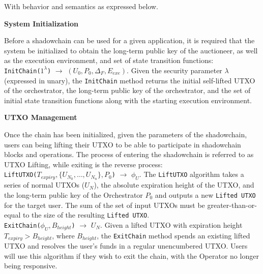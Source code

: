 \documentclass[10pt,a4paper]{article}
\theoremstyle{definition}
\begin{document}
With behavior and semantics as expressed below. \\

\begin{center}
    \textbf{System Initialization}
\end{center}

Before a shadowchain can be used for a given application, it is required that
the system be initialized to obtain the long-term public key of the auctioneer,
as well as the execution environment, and set of state transition functions: \\

\texttt{InitChain($1^{\lambda}$)} $\rightarrow$ $(U_{0}, P_{0}, \Delta_F,
E_{exe})$. Given the security parameter $\lambda$ (expressed in unary), the
\texttt{InitChain} method returns the initial self-lifted UTXO of the
orchestrator, the long-term public key of the orchestrator, and the set of
initial state transition functions along with the starting execution
environment.


\begin{center}
    \textbf{UTXO Management}
\end{center}

Once the chain has been initialized, given the parameters of the shadowchain,
users can being lifting their UTXO to be able to participate in shadowchain
blocks and operations. The process of entering the shadowchain is referred to as
UTXO Lifting, while exiting is the reverse process: \\

\texttt{LiftUTXO($T_{expiry}, \{U_{N_0}, \ldots, U_{N_n}\}, P_{0}$)}
$\rightarrow$ $\phi_{U}$. The \texttt{LiftUTXO} algorithm takes a series of
normal UTXOs ($U_N$), the absolute expiration height of the UTXO, and the
long-term public key of the Orchestrator $P_{0}$ and outputs a new
\texttt{Lifted UTXO} for the target user. The sum of the set of input UTXOs
must be greater-than-or-equal to the size of the resulting \texttt{Lifted
UTXO}. \\

\texttt{ExitChain($\phi_{U}, B_{height}$)} $\rightarrow$ $U_{N}$. Given a lifted
UTXO with expiration height $T_{expiry} > B_{height}$, where $B_{height}$, the
\texttt{ExitChain} method spends an existing lifted UTXO and resolves the
user's funds in a regular unencumbered UTXO. Users will use this algorithm if
they wish to exit the chain, with the Operator no longer being responsive. \\ 
\end{document}
